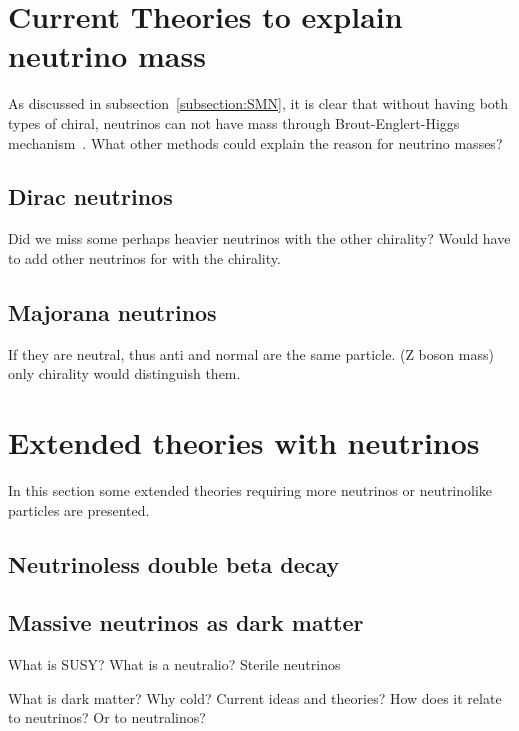 \section{Current Theories to explain neutrino mass}
As discussed in subsection~\ref{subsection:SMN}, it is clear that without having both types of chiral, neutrinos can not have mass through Brout\hyp{}Englert\hyp{}Higgs mechanism~\cite{35Higgs}. What other methods could explain the reason for neutrino masses?

\subsection{Dirac neutrinos}
Did we miss some perhaps heavier neutrinos with the other chirality? Would have to add other neutrinos for with the chirality.

\subsection{Majorana neutrinos}
If they are neutral, thus anti and normal are the same particle. (Z boson mass) only chirality would distinguish them.

\section{Extended theories with neutrinos}
In this section some extended theories requiring more neutrinos or neutrinolike particles are presented.

\subsection{Neutrinoless double beta decay}

\subsection{Massive neutrinos as dark matter}
What is SUSY? What is a neutralio? Sterile neutrinos

What is dark matter? Why cold? Current ideas and theories? How does it relate to neutrinos? Or to neutralinos?


%
